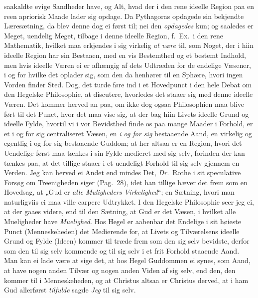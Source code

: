 \documentclass[12pt,a4paper]{book}
\newcommand{\apage}[1]{\marginnote{\footnotesize\textit{[#1]}}}
\begin{document}
saakaldte evige Sandheder have, og Alt, hvad der i den rene ideelle Region
paa en reen apriorisk Maade lader sig opdage. Da Pythagoras opdagede sin
bekjendte Læresætning, da blev denne dog ei først til; nei den \emph{opdagedes}
kun; og saaledes er Meget, uendelig Meget, tilbage i denne ideelle Region,
f.\ Ex.\ i den rene Mathematik, hvilket maa erkjendes i sig virkelig \emph{at
være} til, som \apage{75} Noget, der i hiin ideelle Region har sin Bestaaen, med en vis
Bestemthed og et bestemt Indhold, men hvis ideelle Væren ei er afhængig af
dets Udtræden for de endelige Væsener, i og for hvilke det oplader sig, som
den da henhører til en Sphære, hvori ingen Vorden finder Sted. Dog, det
turde føre ind i et Hovedpunct i den hele Debat om den Hegelske
Philosophie, at discutere, hvorledes det staaer sig med denne ideelle
Væren. Det kommer herved an paa, om ikke dog ogsaa Philosophien maa blive
ført til det Punct, hvor det maa vise sig, at der bag hiin Livets ideelle
Grund og ideelle Fylde, hvortil vi i vor Bevidsthed finde os paa mange
Maader i Forhold, er et i og for sig centraliseret Væsen, en \emph{i og for sig}
bestaaende Aand, en virkelig og egentlig i og for sig bestaaende Guddom; at
her altsaa er en Region, hvori det Uendelige først maa tænkes i sin Fylde
medieret med sig selv, forinden der kan tænkes paa, at det tillige staaer i
et uendeligt Forhold til sig selv gjennem en Verden. Jeg kan herved ei
Andet end mindes Det, \textit{Dr.}\ Rothe i sit speculative Forsøg om Treenigheden
siger (Pag.\ 28), idet han tillige hæver det frem som en Hovedsag, at
„Gud er \emph{alle Muligheders Virkelighed}“; en Sætning, hvori man
naturligviis ei maa ville carpere Udtrykket. I den Hegelske Philosophie
seer jeg ei, at der gaaes videre, end til den Sætning, at Gud er det Væsen,
i hvilket alle Mueligheder have \emph{Muelighed}. Hos Hegel er aabenbar det
Endelige i sit høieste Punct (Menneskeheden) det Medierende for, at Livets
og Tilværelsens ideelle Grund og Fylde (Ideen) kommer til træde frem som
den sig selv bevidste, derfor som den til sig selv kommende og til sig selv
i et frit Forhold staaende Aand. Man kan ei lade være at sige det, at hos
Hegel Guddommen ei synes, som Aand, at have nogen anden Tilvær og nogen
anden Viden af sig selv, end den, den kommer til i Menneskeheden, og at
Christus altsaa er Christus derved, at i ham Gud allerførst \emph{tilfulde} sagde
\emph{Jeg} til sig selv.
\end{document}
